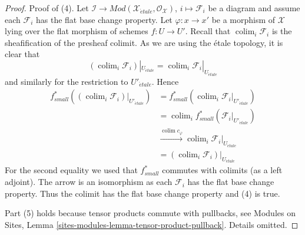 \documentclass{stacks-project}
\theoremstyle{plain}
\theoremstyle{definition}
\theoremstyle{remark}
\numberwithin{equation}{subsection}
\def\colim{\mathop{\mathrm{colim}}\nolimits}
\def\etale{{\acute{e}tale}}
\begin{document}
\begin{proof}
\medskip\noindent
Proof of (4). Let $\mathcal{I} \to
\textit{Mod}(\mathcal{X}_\etale, \mathcal{O}_\mathcal{X})$,
$i \mapsto \mathcal{F}_i$ be a diagram and assume each $\mathcal{F}_i$
has the flat base change property. Let $\varphi : x \to x'$ be a morphism
of $\mathcal{X}$ lying over the flat morphism of schemes $f : U \to U'$.
Recall that $\colim_i \mathcal{F}_i$ is the sheafification of the presheaf
colimit. As we are using the \'etale topology, it is clear that
$$
(\colim_i \mathcal{F}_i)|_{U_\etale} =
\colim_i {\mathcal{F}_i}|_{U_\etale}
$$
and similarly for the restriction to $U'_\etale$. Hence
\begin{align*}
f_{small}^*((\colim_i \mathcal{F}_i)|_{U'_\etale})
& =
f_{small}^*(\colim_i {\mathcal{F}_i}|_{U'_\etale}) \\
& =
\colim_i f_{small}^*({\mathcal{F}_i}|_{U'_\etale}) \\
& \xrightarrow{\colim c_\varphi}
\colim_i \mathcal{F}_i|_{U_\etale} \\
& =
(\colim_i \mathcal{F}_i)|_{U_\etale}
\end{align*}
For the second equality we used that $f_{small}^*$ commutes with colimits
(as a left adjoint). The arrow is an isomorphism as each
$\mathcal{F}_i$ has the flat base change property. Thus the colimit
has the flat base change property and (4) is true.

\medskip\noindent
Part (5) holds because tensor products commute with pullbacks, see
Modules on Sites, Lemma \ref{sites-modules-lemma-tensor-product-pullback}.
Details omitted.


\end{proof}
\end{document}
